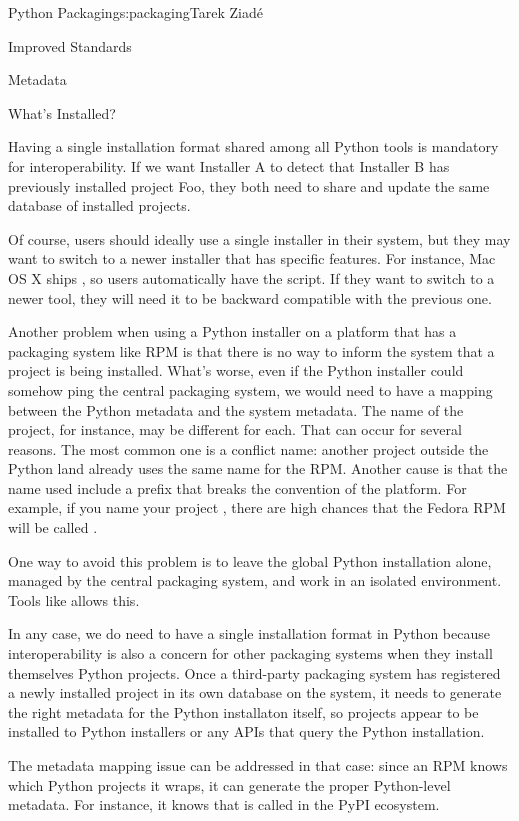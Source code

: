 \begin{aosachapter}{Python Packaging}{s:packaging}{Tarek Ziad\'{e}}
\begin{aosasect1}{Improved Standards}
\begin{aosasect2}{Metadata}
\end{aosasect2}

\begin{aosasect2}{What's Installed?}

Having a single installation format shared among all Python tools is
mandatory for interoperability. If we want Installer A to detect that
Installer B has previously installed project Foo, they both need to
share and update the same database of installed projects.

Of course, users should ideally use a single installer in their
system, but they may want to switch to a newer installer that has
specific features. For instance, Mac OS X ships , so
users automatically have the  script. If they
want to switch to a newer tool, they will need it to be backward
compatible with the previous one.

Another problem when using a Python installer on a platform that has a
packaging system like RPM is that there is no way to inform the system
that a project is being installed. What's worse, even if the Python
installer could somehow ping the central packaging system, we would
need to have a mapping between the Python metadata and the system
metadata. The name of the project, for instance, may be different for
each. That can occur for several reasons. The most common one is 
a conflict name: another project outside the Python land already uses
the same name for the RPM. Another cause is that the name used include
a  prefix that breaks the convention of the platform.
For example, if you name your project , there are high
chances that the Fedora RPM will be called .

One way to avoid this problem is to leave the global Python
installation alone, managed by the central packaging system, and work
in an isolated environment.  Tools like  allows this.

In any case, we do need to have a single installation format in Python
because interoperability is also a concern for other packaging systems
when they install themselves Python projects.  Once a third-party 
packaging system has registered a newly installed project in its 
own database on the system, it needs to generate the right metadata 
for the Python installaton itself, so projects appear to be installed 
to Python installers or any APIs that query the Python installation.

The metadata mapping issue can be addressed in that case: since an RPM
knows which Python projects it wraps, it can generate the proper
Python-level metadata. For instance, it knows that
 is called  in the PyPI ecosystem.


\end{aosasect2}
\end{aosasect1}
\end{aosachapter}

